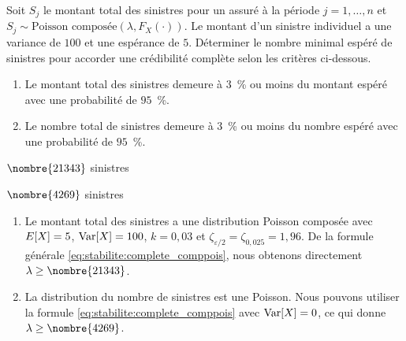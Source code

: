 \begin{exercice}
  Soit $S_{j}$ le montant total des sinistres pour un assuré à la
  période $j = 1, \dots, n$ et
  $S_{j} \sim \text{Poisson composée}(\lambda, F_X(\cdot))$. Le
  montant d'un sinistre individuel a une variance de $100$ et une
  espérance de $5$. Déterminer le nombre minimal espéré de sinistres
  pour accorder une crédibilité complète selon les critères
  ci-dessous.
  \begin{enumerate}
  \item Le montant total des sinistres demeure à $3$~\% ou moins du
    montant espéré avec une probabilité de $95$~\%.
  \item Le nombre total de sinistres demeure à $3$~\% ou moins du nombre
    espéré avec une probabilité de $95$~\%.
  \end{enumerate}
  \begin{rep}
    \begin{inparaenum}
    \item $\nombre{21343}$ sinistres
    \item $\nombre{4269}$ sinistres
    \end{inparaenum}
  \end{rep}
  \begin{sol}
    \begin{enumerate}
    \item Le montant total des sinistres a une distribution Poisson
      composée avec $E [ X ] = 5$, $\operatorname{Var} [ X ] = 100$, $k = 0,03$ et
      $\zeta_{\varepsilon/2} = \zeta_{0,025} = 1,96$. De la formule
      générale \eqref{eq:stabilite:complete_comppois}, nous obtenons
      directement $\lambda \geq \nombre{21343}$.
    \item La distribution du nombre de sinistres est une Poisson. Nous
      pouvons utiliser la formule
      \eqref{eq:stabilite:complete_comppois} avec $\operatorname{Var} [ X ] = 0$, ce
      qui donne $\lambda \geq \nombre{4269}$.
    \end{enumerate}
  \end{sol}
\end{exercice}

